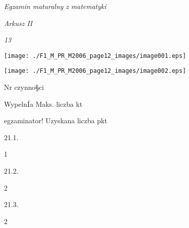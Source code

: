 \documentclass[a4paper,12pt]{article}
\begin{document}
{\it Egzamin maturalny z matematyki}

{\it Arkusz II}

{\it 13}
\begin{center}
\texttt{[image: ./F1\_M\_PR\_M2006\_page12\_images/image001.eps]}

\texttt{[image: ./F1\_M\_PR\_M2006\_page12\_images/image002.eps]}
\end{center}
Nr czynno\S ci

WypelnÍa Maks. liczba kt

egzaminator! Uzyskana liczba pkt

21.1.

1

21.2.

2

21.3.

2
\end{document}

